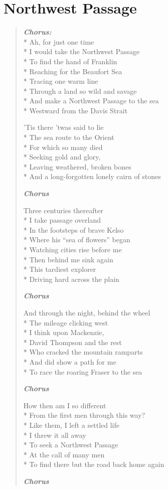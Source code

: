 \documentclass[9pt,twoside]{extarticle}
\newenvironment{xverse}{
	\begin{verse}
	\fontsize{8.5}{10.5}\selectfont
	}
	{
	\end{verse}
	\penalty 0
}
\newcommand{\chorusdef}{\textbf{\emph{Chorus:}}\\*}
\newcommand{\chorusmark}[1][1]{%
\vspace{-0.5\stanzaskip}%
\textbf{\emph{Chorus \ifthenelse{\equal{#1}{1}}{}{$\times$ #1}}}%
\vspace{-0.5\stanzaskip}%
}
\begin{document}
\section{Northwest Passage}

\begin{xverse}
\chorusdef
Ah, for just one time \\*
I would take the Northwest Passage \\*
To find the hand of Franklin \\*
Reaching for the Beaufort Sea \\*
Tracing one warm line \\*
Through a land so wild and savage \\*
And make a Northwest Passage to the sea \\*
Westward from the Davis Strait

’Tis there ’twas said to lie \\*
The sea route to the Orient \\*
For which so many died \\*
Seeking gold and glory, \\*
Leaving weathered, broken bones \\*
And a long-forgotten lonely cairn of stones

\chorusmark

Three centuries thereafter \\*
I take passage overland \\*
In the footsteps of brave Kelso \\*
Where his “sea of flowers” began \\*
Watching cities rise before me \\*
Then behind me sink again \\*
This tardiest explorer \\*
Driving hard across the plain

\chorusmark

And through the night, behind the wheel \\*
The mileage clicking west \\*
I think upon Mackenzie, \\*
David Thompson and the rest \\*
Who cracked the mountain ramparts \\*
And did show a path for me \\*
To race the roaring Fraser to the sea

\chorusmark

How then am I so different \\*
From the first men through this way? \\*
Like them, I left a settled life \\*
I threw it all away \\*
To seek a Northwest Passage \\*
At the call of many men \\*
To find there but the road back home again

\chorusmark
\end{xverse}
\end{document}
